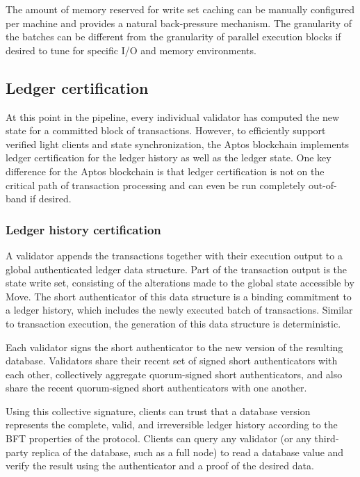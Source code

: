 \documentclass{article}
\begin{document}
The amount of memory reserved for write set caching can be manually configured per machine and provides a natural back-pressure mechanism. The granularity of the batches can be different from the granularity of parallel execution blocks if desired to tune for specific I/O and memory environments.

\subsection{Ledger certification}

At this point in the pipeline, every individual validator has computed the new state for a committed block of transactions. However, to efficiently support verified light clients and state synchronization, the Aptos blockchain implements ledger certification for the ledger history as well as the ledger state. One key difference for the Aptos blockchain is that ledger certification is not on the critical path of transaction processing and can even be run completely out-of-band if desired.

\subsubsection{Ledger history certification}
\label{subsubsec:ledger_history_certification}

A validator appends the transactions together with their execution output to a global authenticated ledger data structure. Part of the transaction output is the state write set, consisting of the alterations made to the global state accessible by Move. The short authenticator of this data structure is a binding commitment to a ledger history, which includes the newly executed batch of transactions. Similar to transaction execution, the generation of this data structure is deterministic.

Each validator signs the short authenticator to the new version of the resulting database. Validators share their recent set of signed short authenticators with each other, collectively aggregate quorum-signed short authenticators, and also share the recent quorum-signed short authenticators with one another.

Using this collective signature, clients can trust that a database version represents the complete, valid, and irreversible ledger history according to the BFT properties of the protocol. Clients can query any validator (or any third-party replica of the database, such as a full node) to read a database value and verify the result using the authenticator and a proof of the desired data. 
\end{document}
